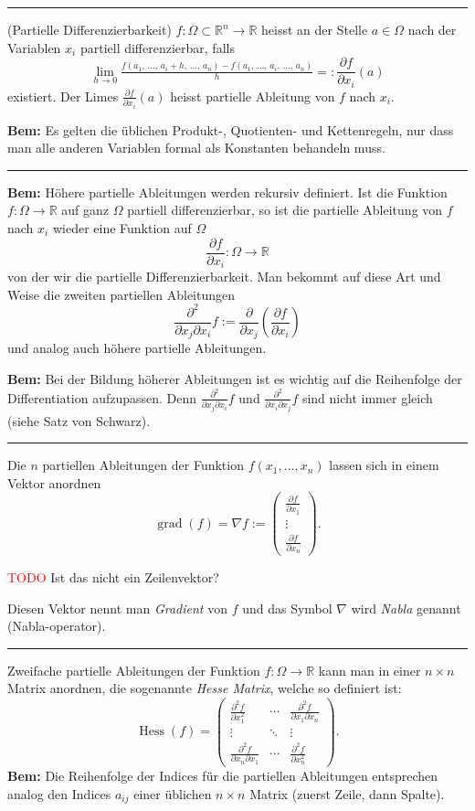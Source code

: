 \documentclass[a4paper,landscape,8pt]{extarticle}
\newcommand{\R}{\mathbb{R}}
\newcommand{\todo}{\textcolor{red}{TODO }}
\newcommand{\sep}{\vspace{5pt}\noindent\hrule\vspace{5pt}}
\newcommand{\Bem}{\textbf{Bem: }}
\DeclareMathOperator{\grad}{grad}
\DeclareMathOperator{\Hess}{Hess}
\begin{document}
\begin{multicols*}{4}
\sep

\Def (Partielle Differenzierbarkeit) $f\colon\Omega\subset\R^n\to\R$ heisst an
der Stelle $a\in\Omega$ nach der Variablen $x_i$ partiell differenzierbar, falls
\[
\lim_{h\to 0}
\tfrac{f(a_1,\,\ldots,\,
a_i+h,\,\ldots,\,a_n)-f(a_1,\, \ldots, \,a_i, \,\ldots, \,a_n)}{h}
=:\frac{\partial f}{\partial x_i}(a)
\]
existiert. Der Limes $\frac{\partial f}{\partial x_i}(a)$ heisst partielle
Ableitung von $f$ nach $x_i$.

\Bem Es gelten die üblichen Produkt-, Quotienten- und Kettenregeln, nur dass man
alle anderen Variablen formal als Konstanten behandeln muss.

\sep

\Bem Höhere partielle Ableitungen werden rekursiv definiert. Ist die Funktion
$f\colon\Omega\to\R$ auf ganz $\Omega$ partiell differenzierbar, so ist die
partielle Ableitung von $f$ nach $x_i$ wieder eine Funktion auf $\Omega$
\[
\frac{\partial f}{\partial x_i}\colon \Omega \to \R
\]
von der wir die partielle Differenzierbarkeit. Man bekommt auf diese Art und
Weise die zweiten partiellen Ableitungen
\[
\frac{\partial^2}{\partial x_j\partial x_i} f :=
\frac{\partial}{\partial x_j} \left(\frac{\partial f}{\partial x_i}\right)
\]
und analog auch höhere partielle Ableitungen.

\Bem Bei der Bildung höherer Ableitungen ist es wichtig auf die Reihenfolge der
Differentiation aufzupassen. Denn $\frac{\partial^2}{\partial x_j\partial x_i}
f$ und $\frac{\partial^2}{\partial x_i\partial x_j}f$ sind nicht immer gleich
(siehe Satz von Schwarz).

\sep

\Def Die $n$ partiellen Ableitungen der Funktion $f(x_1,\ldots,x_n)$ lassen sich
in einem Vektor anordnen
\[
\grad(f) = \nabla f := \begin{pmatrix}
\frac{\partial f}{\partial{x_1}}\\
\vdots\\
\frac{\partial f}{\partial{x_n}}
\end{pmatrix}.
\]
\begin{warmup}
\todo{Ist das nicht ein Zeilenvektor?}
\end{warmup}

Diesen Vektor nennt man \emph{Gradient} von $f$ und das Symbol $\nabla$ wird
\emph{Nabla} genannt (Nabla-operator).

\sep

\Def Zweifache partielle Ableitungen der Funktion $f\colon\Omega\to\R$ kann man
in einer $n\times n$ Matrix anordnen, die sogenannte \emph{Hesse Matrix}, welche
so definiert ist:
\[
\Hess(f)=\begin{pmatrix}
\frac{\partial^2 f}{\partial x_1^2} & \cdots & \frac{\partial^2 f}{\partial x_1
\partial x_n} \\
\vdots & \ddots & \vdots\\
\frac{\partial^2 f}{\partial x_n \partial x_1} & \cdots & \frac{\partial^2
f}{\partial x_n^2}
\end{pmatrix}.
\]
\Bem Die Reihenfolge der Indices für die partiellen Ableitungen entsprechen
analog den Indices $a_{ij}$ einer üblichen $n\times n$ Matrix (zuerst Zeile,
dann Spalte).


\end{multicols*}
\end{document}
